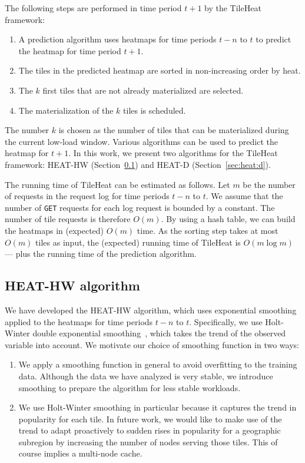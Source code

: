 \documentclass[11pt, oneside]{report}
\begin{document}
The following steps are performed in time period $t+1$ by the TileHeat framework:
%
\begin{enumerate}
\item A prediction algorithm uses heatmaps for time periods $t-n$ to $t$ to predict the heatmap for time period $t+1$.
\item The tiles in the predicted heatmap are sorted in non-increasing order by heat.
\item The $k$ first tiles that are not already materialized are selected.
\item The materialization of the $k$ tiles is scheduled.
\end{enumerate}

The number $k$ is chosen as the number of tiles that can be materialized during the current low-load window. Various algorithms can be used to predict the heatmap for $t + 1$. In this work, we present two algorithms for the TileHeat framework: HEAT-HW (Section~\ref{sec:heat:hw}) and HEAT-D (Section~\ref{sec:heat:d}).

The running time of TileHeat can be estimated as follows. Let $m$ be the number of requests in the request log for time periods $t-n$ to $t$. We assume that the number of \texttt{GET} requests for each log request is bounded by a constant. The number of tile requests is therefore $O(m)$. By using a hash table, we can build the heatmaps in (expected) $O(m)$ time. As the sorting step takes at most $O(m)$ tiles as input, the (expected) running time of TileHeat is $O(m \log m)$ --- plus the running time of the prediction algorithm. 

\subsection{HEAT-HW algorithm}
\label{sec:heat:hw}
We have developed the HEAT-HW algorithm, which uses exponential smoothing applied to the heatmaps for time periods $t-n$ to $t$. Specifically, we use Holt-Winter double exponential smoothing~\cite{chatfield88}, which takes the trend of the observed variable into account. We motivate our choice of smoothing function in two ways:

\begin{enumerate}
\item We apply a smoothing function in general to avoid overfitting to the training data. Although the data we have analyzed is very stable, we introduce smoothing to prepare the algorithm for less stable workloads.
\item We use Holt-Winter smoothing in particular because it captures the trend in popularity for each tile. In future work, we would like to make use of the trend to adapt proactively to sudden rises in popularity for a geographic subregion by increasing the number of nodes serving those tiles. This of course implies a multi-node cache.
\end{enumerate}
\end{document}
